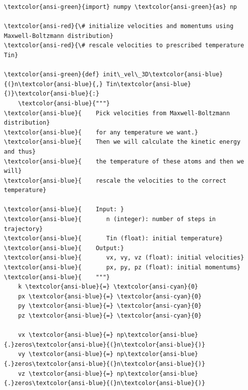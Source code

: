 \documentclass[11pt]{article}
\begin{document}
    
    \begin{Verbatim}[commandchars=\\\{\}]
\textcolor{ansi-green}{import} numpy \textcolor{ansi-green}{as} np

\textcolor{ansi-red}{\# initialize velocities and momentums using Maxwell-Boltzmann distribution}
\textcolor{ansi-red}{\# rescale velocities to prescribed temperature Tin}

\textcolor{ansi-green}{def} init\_vel\_3D\textcolor{ansi-blue}{(}n\textcolor{ansi-blue}{,} Tin\textcolor{ansi-blue}{)}\textcolor{ansi-blue}{:}
    \textcolor{ansi-blue}{"""}
\textcolor{ansi-blue}{    Pick velocities from Maxwell-Boltzmann distribution}
\textcolor{ansi-blue}{    for any temperature we want.}
\textcolor{ansi-blue}{    Then we will calculate the kinetic energy and thus}
\textcolor{ansi-blue}{    the temperature of these atoms and then we will}
\textcolor{ansi-blue}{    rescale the velocities to the correct temperature}

\textcolor{ansi-blue}{    Input: }
\textcolor{ansi-blue}{       n (integer): number of steps in trajectory}
\textcolor{ansi-blue}{       Tin (float): initial temperature}
\textcolor{ansi-blue}{    Output:}
\textcolor{ansi-blue}{       vx, vy, vz (float): initial velocities}
\textcolor{ansi-blue}{       px, py, pz (float): initial momentums}
\textcolor{ansi-blue}{    """}
    k \textcolor{ansi-blue}{=} \textcolor{ansi-cyan}{0}
    px \textcolor{ansi-blue}{=} \textcolor{ansi-cyan}{0}
    py \textcolor{ansi-blue}{=} \textcolor{ansi-cyan}{0}
    pz \textcolor{ansi-blue}{=} \textcolor{ansi-cyan}{0}

    vx \textcolor{ansi-blue}{=} np\textcolor{ansi-blue}{.}zeros\textcolor{ansi-blue}{(}n\textcolor{ansi-blue}{)}
    vy \textcolor{ansi-blue}{=} np\textcolor{ansi-blue}{.}zeros\textcolor{ansi-blue}{(}n\textcolor{ansi-blue}{)}
    vz \textcolor{ansi-blue}{=} np\textcolor{ansi-blue}{.}zeros\textcolor{ansi-blue}{(}n\textcolor{ansi-blue}{)}


\end{Verbatim}
\end{document}
